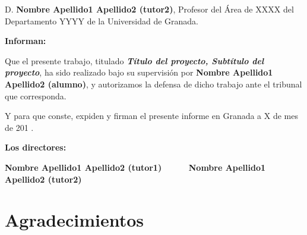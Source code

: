 D. \textbf{Nombre Apellido1 Apellido2 (tutor2)}, Profesor del Área de XXXX del Departamento YYYY de la Universidad de Granada.


\vspace{0.5cm}

\textbf{Informan:}

\vspace{0.5cm}

Que el presente trabajo, titulado \textit{\textbf{Título del proyecto, Subtítulo del proyecto}},
ha sido realizado bajo su supervisión por \textbf{Nombre Apellido1 Apellido2 (alumno)}, y autorizamos la defensa de dicho trabajo ante el tribunal
que corresponda.

\vspace{0.5cm}

Y para que conste, expiden y firman el presente informe en Granada a X de mes de 201 .

\vspace{1cm}

\textbf{Los directores:}

\vspace{5cm}

\noindent \textbf{Nombre Apellido1 Apellido2 (tutor1) \ \ \ \ \ Nombre Apellido1 Apellido2 (tutor2)}

\chapter*{Agradecimientos}
\thispagestyle{empty}

       \vspace{1cm}
       
       
       
       
       
      
